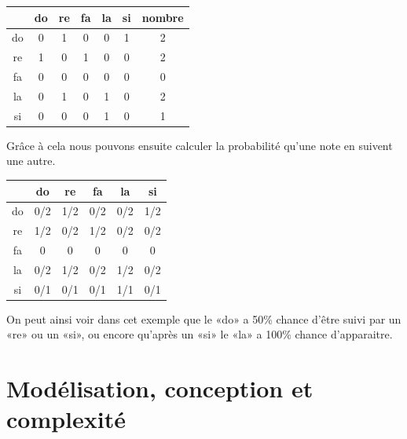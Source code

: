 \documentclass[12pt, a4paper]{article}
\begin{document}
            \begin{center}
                \begin{tabular}{|c|c|c|c|c|c||c|}
                    \hline
                       & do & re & fa & la & si & nombre\\
                    \hline
                    do &  0 &  1 &  0 &  0 &  1 & 2\\
                    \hline
                    re &  1 &  0 &  1 &  0 &  0 & 2\\
                    \hline
                    fa &  0 &  0 &  0 &  0 &  0 & 0\\
                    \hline
                    la &  0 &  1 &  0 &  1 &  0 & 2\\
                    \hline
                    si &  0 &  0 &  0 &  1 &  0 & 1\\
                    \hline
                \end{tabular}
            \end{center}
            
            Grâce à cela nous pouvons ensuite calculer la probabilité qu’une note en suivent une autre.
            
            \begin{center}
                \begin{tabular}{|c|c|c|c|c|c|}
                    \hline
                       &  do &  re &  fa &  la &  si\\
                    \hline
                    do & 0/2 & 1/2 & 0/2 & 0/2 & 1/2\\
                    \hline
                    re & 1/2 & 0/2 & 1/2 & 0/2 & 0/2\\
                    \hline
                    fa &   0 &   0 &   0 &   0 &   0\\
                    \hline
                    la & 0/2 & 1/2 & 0/2 & 1/2 & 0/2\\
                    \hline
                    si & 0/1 & 0/1 & 0/1 & 1/1 & 0/1\\
                    \hline
                \end{tabular}
            \end{center}
            
            On peut ainsi voir dans cet exemple que le «do» a 50\% chance d’être suivi par un «re» ou un «si», ou encore qu’après un «si» le «la» a 100\% chance d’apparaitre.
    
    
    \section{Modélisation, conception et complexité}
\end{document}
